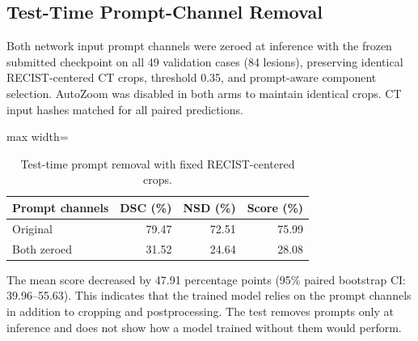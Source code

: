 \subsection{Test-Time Prompt-Channel Removal}
\label{sec:prompt_removal}

Both network input prompt channels were zeroed at inference with the frozen submitted checkpoint on all 49 validation cases (84 lesions), preserving identical RECIST-centered CT crops, threshold 0.35, and prompt-aware component selection. AutoZoom was disabled in both arms to maintain identical crops. CT input hashes matched for all paired predictions.

\begin{table}[htbp]
\centering
\caption{Test-time prompt removal with fixed RECIST-centered crops.}
\label{tab:prompt_removal}
\begin{adjustbox}{max width=\linewidth}
\begin{tabular}{lrrr}
\toprule
\textbf{Prompt channels} & \textbf{DSC (\%)} & \textbf{NSD (\%)} & \textbf{Score (\%)} \\
\midrule
Original & 79.47 & 72.51 & 75.99 \\
Both zeroed & 31.52 & 24.64 & 28.08 \\
\bottomrule
\end{tabular}
\end{adjustbox}
\end{table}

The mean score decreased by 47.91 percentage points (95\% paired bootstrap CI: 39.96--55.63). This indicates that the trained model relies on the prompt channels in addition to cropping and postprocessing. The test removes prompts only at inference and does not show how a model trained without them would perform.
